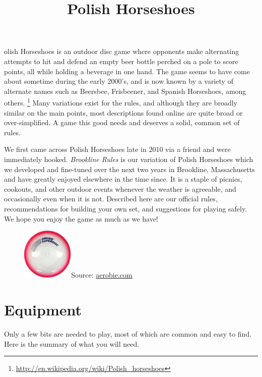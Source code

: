 \documentclass[11pt,letterpaper,twocolumn,english,DIV=calc]{scrartcl}
\title{\textsf{Polish Horseshoes}} %
\author{}
\date{} %
\newcommand{\initial}[1]{ %
	\lettrine[lines=2, lhang=0.35, nindent=0.1em, loversize=0.25]{
		\color{DarkRed}{\textsf{#1}}}{}}
\begin{document}
\maketitle

\thispagestyle{fancy}

\initial{P}olish Horseshoes is an outdoor disc game where opponents make alternating attempts to hit and defend an empty beer bottle perched on a pole to score points, all while holding a beverage in one hand.
The game seems to have come about sometime during the early 2000's, and is now known by a variety of alternate names such as Beersbee, Frisbeener, and Spanish Horseshoes, among others.%
\footnote{\url{http://en.wikipedia.org/wiki/Polish_horseshoes}}
Many variations exist for the rules, and although they are broadly similar on the main points, most descriptions found online are quite broad or over-simplified. 
A game this good needs and deserves a solid, common set of rules.

We first came across Polish Horseshoes late in 2010 via a friend and were immediately hooked. 
\emph{Brookline Rules} is our variation of Polish Horseshoes which we developed and fine-tuned over the next two years in Brookline, Massachusetts and have greatly enjoyed elsewhere in the time since. 
It is a staple of picnics, cookouts, and other outdoor events whenever the weather is agreeable, and occasionally even when it is not. 
Described here are our official rules, recommendations for building your own set, and suggestions for playing safely. 
We hope you enjoy the game as much as we have!

\begin{figure}[H]
	\centering{}
	\includegraphics[width=0.22\textwidth]{images/superdisc}{\footnotesize{}Source:
	\href{http://www.aerobie.com}{aerobie.com}}
\end{figure}


\part*{Equipment}

Only a few bits are needed to play, most of which are common and easy to find.
Here is the summary of what you will need.
\end{document}

